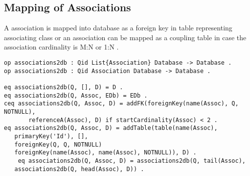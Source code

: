 \documentclass[11pt]{article}
\begin{document}
\subsection{Mapping of Associations}
A association is mapped into database as a foreign key in table representing associating class or an association can be mapped as a coupling table in case the association cardinality is M:N or 1:N . 
\begin{verbatim}
op associations2db : Qid List{Association} Database -> Database .
op associations2db : Qid Association Database -> Database .
	
eq associations2db(Q, [], D) = D .
eq associations2db(Q, Assoc, EDb) = EDb .
ceq associations2db(Q, Assoc, D) = addFK(foreignKey(name(Assoc), Q, NOTNULL), 
	   referenceA(Assoc), D) if startCardinality(Assoc) < 2 . 
eq associations2db(Q, Assoc, D) = addTable(table(name(Assoc), 
   primaryKey('Id'), [], 
   foreignKey(Q, Q, NOTNULL) 
   foreignKey(name(Assoc), name(Assoc), NOTNULL)), D) .
	eq associations2db(Q, Assoc, D) = associations2db(Q, tail(Assoc), 
   associations2db(Q, head(Assoc), D)) .
\end{verbatim}



	
\end{document}
